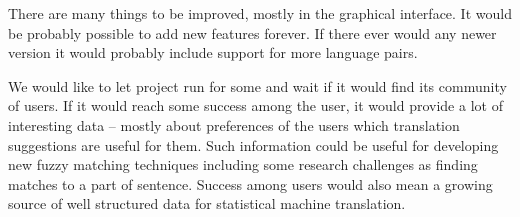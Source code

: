 There are many things to be improved, mostly in the graphical interface. It would be probably possible to add new features forever. If there ever would any newer version it would probably include support for more language pairs.

We would like to let project run for some and wait if it would find its community of users. If it would reach some success among the user, it would provide a lot of interesting data -- mostly about preferences of the users which translation suggestions are useful for them. Such information could be useful for developing new fuzzy matching techniques including some research challenges as finding matches to a part of sentence. Success among users would also mean a growing source of well structured data for statistical machine translation.